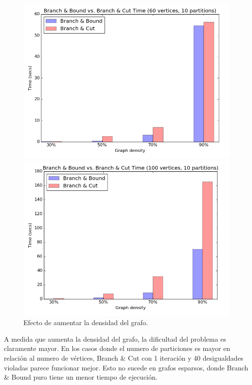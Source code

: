 \begin{figure}[h]
\begin{minipage}[b]{0.49\textwidth}
  \end{minipage}
  \begin{minipage}[b]{0.49\textwidth}
    \includegraphics[width=\textwidth]{img/1-bb_vs_bc_v60_p10_i1_co0_l40_t1_b0.png}
  \end{minipage}
  \hfill
  \begin{minipage}[b]{0.49\textwidth}
    \includegraphics[width=\textwidth]{img/1-bb_vs_bc_v100_p10_i1_co0_l40_t1_b0.png}
  \end{minipage}
	\caption{Efecto de aumentar la densidad del grafo.}
\end{figure}

A medida que aumenta la densidad del grafo, la dificultad del problema es claramente mayor. En los casos donde el numero de particiones es mayor en relación al numero de vértices, Branch \& Cut con 1 iteración y 40 desigualdades violadas parece funcionar mejor. Esto no sucede en grafos esparsos, donde Branch \& Bound puro tiene un menor tiempo de ejecución.

